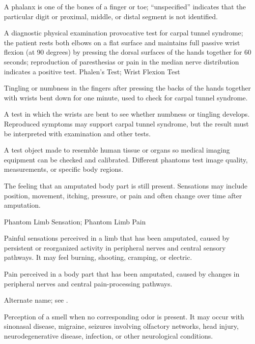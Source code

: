  A phalanx is one of the bones of a finger or toe; “unspecified” indicates that the particular digit or proximal, middle, or distal segment is not identified.

 A diagnostic physical examination provocative test for carpal tunnel syndrome; the patient rests both elbows on a flat surface and maintains full passive wrist flexion (at 90 degrees) by pressing the dorsal surfaces of the hands together for 60 seconds; reproduction of paresthesias or pain in the median nerve distribution indicates a positive test.
\synonyms
Phalen's Test; Wrist Flexion Test

 Tingling or numbness in the fingers after pressing the backs of the hands together with wrists bent down for one minute, used to check for carpal tunnel syndrome.

 A test in which the wrists are bent to see whether numbness or tingling develops. Reproduced symptoms may support carpal tunnel syndrome, but the result must be interpreted with examination and other tests.

 A test object made to resemble human tissue or organs so medical imaging equipment can be checked and calibrated. Different phantoms test image quality, measurements, or specific body regions.

 The feeling that an amputated body part is still present. Sensations may include position, movement, itching, pressure, or pain and often change over time after amputation.

\synonyms
Phantom Limb Sensation; Phantom Limb Pain

 Painful sensations perceived in a limb that has been amputated, caused by persistent or
reorganized activity in peripheral nerves and central sensory pathways. It may feel
burning, shooting, cramping, or electric.

 Pain perceived in a body part that has been amputated, caused by changes in peripheral nerves and central pain-processing pathways.

 Alternate name; see .

 Perception of a smell when no corresponding odor is present. It may occur with sinonasal
disease, migraine, seizures involving olfactory networks, head injury, neurodegenerative
disease, infection, or other neurological conditions.

